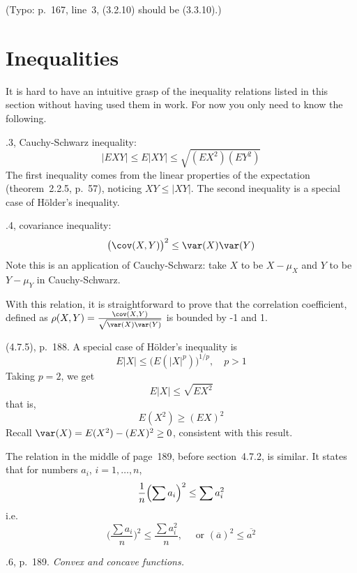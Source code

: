 \documentclass[12pt]{article}
\begin{document}
(Typo: p.~167, line~3, (3.2.10) should be (3.3.10).)


\section{Inequalities}

It is hard to have an intuitive grasp of the inequality relations
listed in this section without having used them in work.
For now you only need to know the following.

.3, Cauchy-Schwarz inequality:
\[
|E XY| \le E|XY| \le \sqrt{(EX^2) (EY^2)}
\]
The first inequality comes from the linear properties of the expectation
(theorem~2.2.5, p.~57), noticing $XY \le |XY|$.
The second inequality is a special case of H{\"o}lder's inequality.

.4, covariance inequality:
\[
\bigl(\cov(X, Y)\bigr)^2 \le \var(X) \var(Y)
\]
Note this is an application of Cauchy-Schwarz:
take $X$ to be $X - \mu_X$ and $Y$ to be $Y - \mu_Y$ in Cauchy-Schwarz.

With this relation, it is straightforward to prove that the correlation
coefficient, defined as
$\rho(X,Y) = \frac{\cov(X,Y)}{\sqrt{\var(X)\var(Y)}}$
is bounded by -1 and 1.

\example (4.7.5), p.~188. A special case of H{\"o}lder's inequality is
\[
E|X| \le \bigl(E(|X|^p)\bigr)^{1/p}, \quad p>1
\]
Taking $p = 2$, we get
\[
E|X| \le \sqrt{E X^2}
\]
that is,
\[
E(X^2) \ge (EX)^2
\]
Recall $\var(X) = E(X^2) - (EX)^2 \ge 0$, consistent with this result.

The relation in the middle of page~189, before section~4.7.2, is
similar.
It states that for numbers $a_i$, $i=1,\dotsc,n$,
\[
\frac{1}{n}\Bigl(\sum a_i\Bigr)^2 \le \sum a_i^2
\]
i.e.
\[
\biggl(\frac{\sum a_i}{n}\biggr)^2 \le \frac{\sum a_i^2}{n}
,\quad\text{ or }
(\overline{a})^2 \le \overline{a^2}
\]

.6, p.~189. \emph{Convex and concave functions.}
\end{document}
